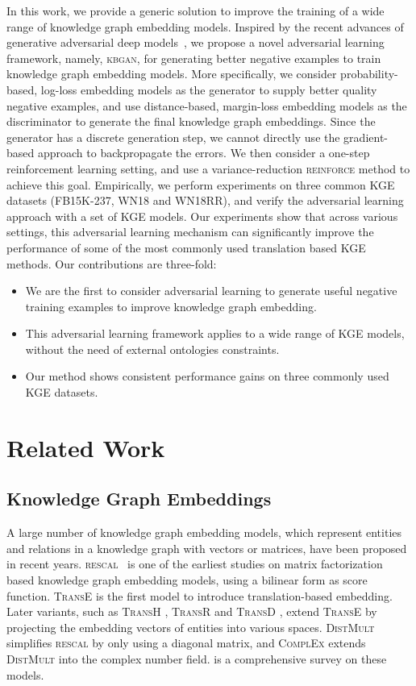 \documentclass[11pt,a4paper]{article}
\begin{document}
In this work, we provide a generic solution to improve the training of a wide range of knowledge graph embedding models. Inspired by the recent advances of generative adversarial deep models~\cite{goodfellow2014generative}, we propose a novel adversarial learning framework, namely, \textsc{kbgan}, for generating better negative examples to train knowledge graph embedding models. More specifically, we consider probability-based, log-loss embedding models as the generator to supply better quality negative examples, and use distance-based, margin-loss embedding models as the discriminator to generate the final knowledge graph embeddings. Since the generator has a discrete generation step, we cannot directly use the gradient-based approach to backpropagate the errors. We then consider a one-step reinforcement learning setting, and use a variance-reduction \textsc{reinforce} method to achieve this goal. Empirically, we perform experiments on three common KGE datasets (FB15K-237, WN18 and WN18RR), and verify the adversarial learning approach with a set of KGE models. Our experiments show that across various settings, this adversarial learning mechanism can significantly improve the performance of some of the most commonly used translation based KGE methods.
Our contributions are three-fold:
\begin{itemize}
\item We are the first to consider adversarial learning to generate useful negative training examples to improve knowledge graph embedding.
\item This adversarial learning framework applies to a wide range of KGE models, without the need of external ontologies constraints.
\item Our method shows consistent performance gains on three commonly used KGE datasets.
\end{itemize}


\section{Related Work}
\subsection{Knowledge Graph Embeddings}
A large number of knowledge graph embedding models, which represent entities and relations in a knowledge graph with 
vectors or matrices, have been proposed in recent years.  \textsc{rescal}~\cite{nickel2011three} is one of the earliest studies on matrix factorization based knowledge graph embedding models, using a bilinear form as score function.
\textsc{TransE} \cite{bordes2013translating} is the first model to introduce translation-based embedding. Later variants, such as \textsc{TransH} \cite{wang2014knowledge}, \textsc{TransR} \cite{lin2015learning} and \textsc{TransD} \cite{transd}, extend \textsc{TransE} by projecting the embedding vectors of entities into various spaces.
\textsc{DistMult}~\cite{yang2015embedding} simplifies \textsc{rescal} by only using a diagonal matrix, and \textsc{ComplEx} \cite{trouillon2016complex} extends \textsc{DistMult} into the complex number field. \cite{kgreview} is a comprehensive survey on these models.
\end{document}
